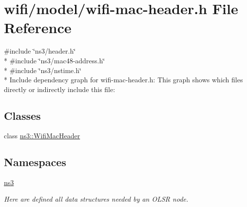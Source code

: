 \hypertarget{wifi-mac-header_8h}{}\section{wifi/model/wifi-\/mac-\/header.h File Reference}
\label{wifi-mac-header_8h}
{\ttfamily \#include \char`\"{}ns3/header.\+h\char`\"{}}\\*
{\ttfamily \#include \char`\"{}ns3/mac48-\/address.\+h\char`\"{}}\\*
{\ttfamily \#include \char`\"{}ns3/nstime.\+h\char`\"{}}\\*
Include dependency graph for wifi-\/mac-\/header.h\+:
This graph shows which files directly or indirectly include this file\+:
\subsection*{Classes}
\begin{DoxyCompactItemize}
\item 
class \hyperlink{classns3_1_1WifiMacHeader}{ns3\+::\+Wifi\+Mac\+Header}
\end{DoxyCompactItemize}
\subsection*{Namespaces}
\begin{DoxyCompactItemize}
\item 
 \hyperlink{namespacens3}{ns3}
\begin{DoxyCompactList}\small\item\em Here are defined all data structures needed by an O\+L\+SR node. \end{DoxyCompactList}\end{DoxyCompactItemize}
